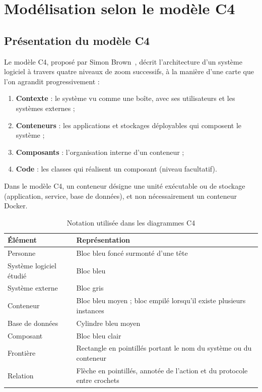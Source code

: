 \documentclass[11pt,a4paper]{report}
\begin{document}
\chapter{Modélisation selon le modèle C4}\label{ch:c4}

\section{Présentation du modèle C4}

Le modèle C4, proposé par Simon Brown~\cite{brownC4}, décrit l'architecture d'un système logiciel à travers quatre niveaux de zoom successifs, à la manière d'une carte que l'on agrandit progressivement :
\begin{enumerate}
  \item \textbf{Contexte} : le système vu comme une boîte, avec ses utilisateurs et les systèmes externes ;
  \item \textbf{Conteneurs} : les applications et stockages déployables qui composent le système ;
  \item \textbf{Composants} : l'organisation interne d'un conteneur ;
  \item \textbf{Code} : les classes qui réalisent un composant (niveau facultatif).
\end{enumerate}
Dans le modèle C4, un \og conteneur \fg{} désigne une unité exécutable ou de stockage (application, service, base de données), et non nécessairement un conteneur Docker.

\begin{table}[H]
\centering
\caption{Notation utilisée dans les diagrammes C4}
\label{tab:notation}
\begin{tabularx}{\textwidth}{l L}
\toprule
{}\textbf{Élément} & \textbf{Représentation}\\
\midrule
Personne & Bloc bleu foncé surmonté d'une tête\\
Système logiciel étudié & Bloc bleu\\
Système externe & Bloc gris\\
Conteneur & Bloc bleu moyen ; bloc empilé lorsqu'il existe plusieurs instances\\
Base de données & Cylindre bleu moyen\\
Composant & Bloc bleu clair\\
Frontière & Rectangle en pointillés portant le nom du système ou du conteneur\\
Relation & Flèche en pointillés, annotée de l'action et du protocole entre crochets\\
\bottomrule
\end{tabularx}
\end{table}
\end{document}
